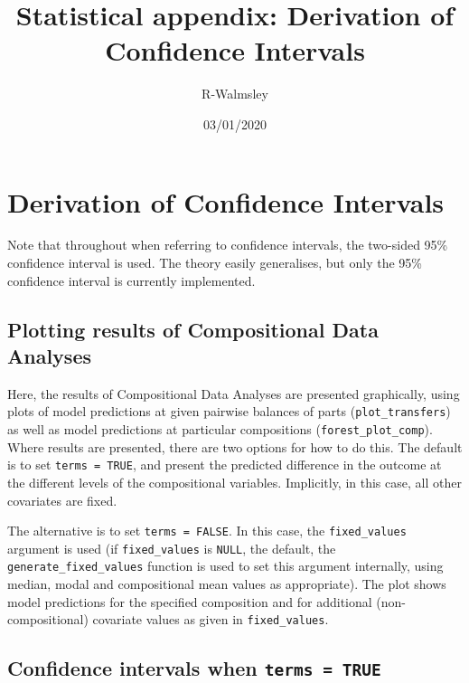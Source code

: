 \documentclass[
]{article}
\title{Statistical appendix: Derivation of Confidence Intervals}
\author{R-Walmsley}
\date{03/01/2020}
\begin{document}
\maketitle

\hypertarget{derivation-of-confidence-intervals}{%
\section{Derivation of Confidence
Intervals}\label{derivation-of-confidence-intervals}}

Note that throughout when referring to confidence intervals, the
two-sided 95\% confidence interval is used. The theory easily
generalises, but only the 95\% confidence interval is currently
implemented.

\hypertarget{plotting-results-of-compositional-data-analyses}{%
\subsection{Plotting results of Compositional Data
Analyses}\label{plotting-results-of-compositional-data-analyses}}

Here, the results of Compositional Data Analyses are presented
graphically, using plots of model predictions at given pairwise balances
of parts (\texttt{plot\_transfers}) as well as model predictions at
particular compositions (\texttt{forest\_plot\_comp}). Where results are
presented, there are two options for how to do this. The default is to
set \texttt{terms\ =\ TRUE}, and present the predicted difference in the
outcome at the different levels of the compositional variables.
Implicitly, in this case, all other covariates are fixed.

The alternative is to set \texttt{terms\ =\ FALSE}. In this case, the
\texttt{fixed\_values} argument is used (if \texttt{fixed\_values} is
\texttt{NULL}, the default, the \texttt{generate\_fixed\_values}
function is used to set this argument internally, using median, modal
and compositional mean values as appropriate). The plot shows model
predictions for the specified composition and for additional
(non-compositional) covariate values as given in \texttt{fixed\_values}.

\hypertarget{confidence-intervals-when-terms-true}{%
\subsection{\texorpdfstring{Confidence intervals when
\texttt{terms\ =\ TRUE}}{Confidence intervals when terms = TRUE}}\label{confidence-intervals-when-terms-true}}
\end{document}
